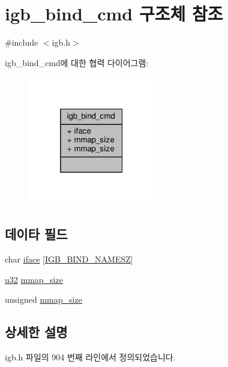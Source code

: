 \hypertarget{structigb__bind__cmd}{}\section{igb\+\_\+bind\+\_\+cmd 구조체 참조}
\label{structigb__bind__cmd}


{\ttfamily \#include $<$igb.\+h$>$}



igb\+\_\+bind\+\_\+cmd에 대한 협력 다이어그램\+:
\nopagebreak
\begin{figure}[H]
\begin{center}
\leavevmode
\includegraphics[width=157pt]{structigb__bind__cmd__coll__graph}
\end{center}
\end{figure}
\subsection*{데이타 필드}
\begin{DoxyCompactItemize}
\item 
char \hyperlink{structigb__bind__cmd_a88d38e6b8b8e975415f5cef8fbfe2b74}{iface} \mbox{[}\hyperlink{igb__internal_8h_a3d5e72fee0b5b7de1b68e1152bc7a87d}{I\+G\+B\+\_\+\+B\+I\+N\+D\+\_\+\+N\+A\+M\+E\+SZ}\mbox{]}
\item 
\hyperlink{lib_2igb_2e1000__osdep_8h_a64e91c10a0d8fb627e92932050284264}{u32} \hyperlink{structigb__bind__cmd_ac76710c49696b7df6ecbef456496ea50}{mmap\+\_\+size}
\item 
unsigned \hyperlink{structigb__bind__cmd_a8d8b3ba9537bc3a0307ef782434516ea}{mmap\+\_\+size}
\end{DoxyCompactItemize}


\subsection{상세한 설명}


igb.\+h 파일의 904 번째 라인에서 정의되었습니다.



